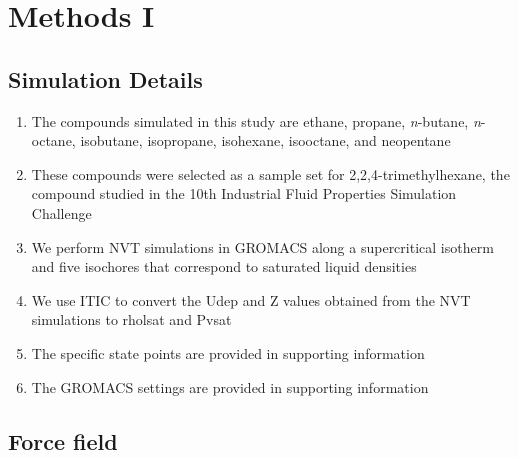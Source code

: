 \documentclass[preprint,letterpaper,floatfix,citeautoscript,aip,jcp]{revtex4-1}
\begin{document}
\section{Methods I}

\subsection{Simulation Details}

\begin{enumerate}
	\item The compounds simulated in this study are ethane, propane, \textit{n}-butane, \textit{n}-octane, isobutane, isopropane, isohexane, isooctane, and neopentane
	\item These compounds were selected as a sample set for 2,2,4-trimethylhexane, the compound studied in the 10th Industrial Fluid Properties Simulation Challenge
	\item We perform NVT simulations in GROMACS along a supercritical isotherm and five isochores that correspond to saturated liquid densities
	\item We use ITIC to convert the Udep and Z values obtained from the NVT simulations to rholsat and Pvsat
	\item The specific state points are provided in supporting information
	\item The GROMACS settings are provided in supporting information
\end{enumerate}

\subsection{Force field}
\end{document}
